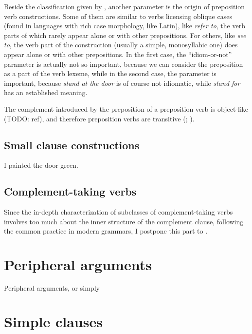 \documentclass[UTF8, a4paper, oneside, scheme=plain]{ctexrep}
\newcommand*{\citepage}[1]{p.~{#1}}
\newcommand{\corpus}[1]{\emph{#1}}
\begin{document}
Beside the classification given by ,
another parameter is the origin of preposition verb constructions.
Some of them are similar to verbs licensing oblique cases
(found in languages with rich case morphology, like Latin),
like \corpus{refer to},
the verb parts of which rarely appear alone or with other prepositions.
For others, like \corpus{see to},
the verb part of the construction (usually a simple, monosyllabic one)
does appear alone or with other prepositions.
In the first case,
the ``idiom-or-not'' parameter is actually not so important,
because we can consider the preposition as a part of the verb lexeme,
while in the second case,
the parameter is important,
because \corpus{stand at the door} is of course not idiomatic,
while \corpus{stand for} has an established meaning.

The complement introduced by the preposition of a preposition verb 
is object-like (TODO: ref),
and therefore preposition verbs are transitive
(\citealt[\citepage{291}, \citepage{297}]{dixon2005semantic};
\citealt[\citepage{277}]{cgel}).

\section{Small clause constructions}

\begin{exe}
    \ex I painted the door green.
\end{exe}

\section{Complement-taking verbs}

Since the in-depth characterization of subclasses of complement-taking verbs 
involves too much about the inner structure of the complement clause,
following the common practice in modern grammars,
I postpone this part to .

\chapter{Peripheral arguments}\label{chap:peripheral-arguments}

Peripheral arguments, or simply 

\chapter{Simple clauses}\label{chap:simple-clause}
\end{document}
